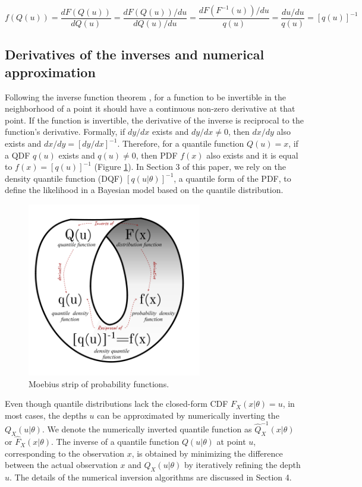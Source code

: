 \documentclass[
  12pt,
]{article}
\begin{document}
\[
f(Q(u))=\frac{dF(Q(u))}{dQ(u)} = \frac{dF(Q(u))/du}{dQ(u)/du}=\frac{dF(F^{-1}(u))/du}{q(u)}=\frac{du/du}{q(u)}=[q(u)]^{-1}
\]

\hypertarget{derivatives-of-the-inverses-and-numerical-approximation}{%
\subsection{Derivatives of the inverses and numerical approximation}\label{derivatives-of-the-inverses-and-numerical-approximation}}

Following the inverse function theorem \citep{price1984InverseFunctionTheorem}, for a function to be invertible in the neighborhood of a point it should have a continuous non-zero derivative at that point. If the function is invertible, the derivative of the inverse is reciprocal to the function's derivative. Formally, if \(dy/dx\) exists and \(dy/dx \neq 0\), then \(dx/dy\) also exists and \(dx/dy=[dy/dx]^{-1}\). Therefore, for a quantile function \(Q(u)=x\), if a QDF \(q(u)\) exists and \(q(u)\neq0\), then PDF \(f(x)\) also exists and it is equal to \(f(x)=[q(u)]^{-1}\) (Figure \ref{fig:moebius-chart}). In Section 3 of this paper, we rely on the density quantile function (DQF) \([q(u|\theta)]^{-1}\), a quantile form of the PDF, to define the likelihood in a Bayesian model based on the quantile distribution.

\begin{figure}

{\centering \includegraphics[width=3in]{img/moebius-loop} 

}

\caption{Moebius strip of probability functions.}\label{fig:moebius-chart}
\end{figure}

Even though quantile distributions lack the closed-form CDF \(F_X(x|\theta)=u\), in most cases, the depths \(u\) can be approximated by numerically inverting the \(Q_X(u|\theta)\). We denote the numerically inverted quantile function as \(\widehat{Q}^{-1}_X(x|\theta)\) or \(\widehat{F}_X(x|\theta)\). The inverse of a quantile function \(Q(u|\theta)\) at point \(u\), corresponding to the observation \(x\), is obtained by minimizing the difference between the actual observation \(x\) and \(Q_X(u|\theta)\) by iteratively refining the depth \(u\). The details of the numerical inversion algorithms are discussed in Section 4.
\end{document}

